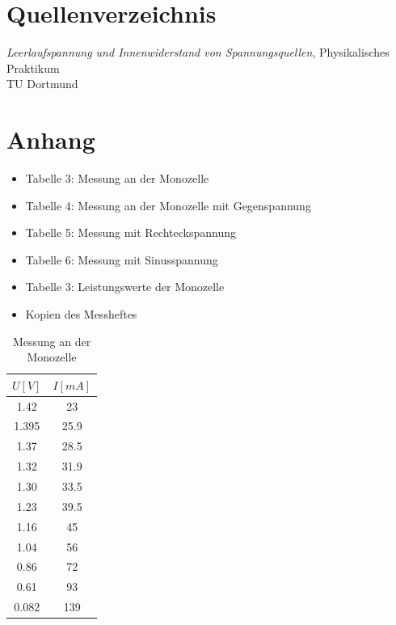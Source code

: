 \documentclass[11pt,ngerman,a4paper]{article}
\begin{document}
\section{Quellenverzeichnis}
\begin{enumerate}[{[}1{]}]

\item \textit{Leerlaufspannung und Innenwiderstand von Spannungsquellen}, Physikalisches Praktikum\\ TU Dortmund
\end{enumerate}

\section{Anhang}
\begin{itemize}

\item Tabelle 3: Messung an der Monozelle
\item Tabelle 4: Messung an der Monozelle mit Gegenspannung
\item Tabelle 5: Messung mit Rechteckspannung
\item Tabelle 6: Messung mit Sinusspannung
\item Tabelle 3: Leistungswerte der Monozelle
\item Kopien des Messheftes
\end{itemize}
\newpage
\begin{table}[h]
 \centering

 \begin{tabular}{|c|c|}
  \hline
  $U[V]$ & $I[mA]$  \\
  \hline
  1.42 & 23 \\
  1.395 & 25.9 \\
  1.37& 28.5 \\
  1.32 & 31.9 \\
  1.30 & 33.5\\
  1.23 & 39.5\\
  1.16 & 45 \\
  1.04 & 56\\
  0.86 & 72\\
  0.61 & 93\\
  0.082 & 139\\
  \hline
 \end{tabular}
  \caption{Messung an der Monozelle}
 \label{Messung 1}
 \end{table}
 
\end{document}
